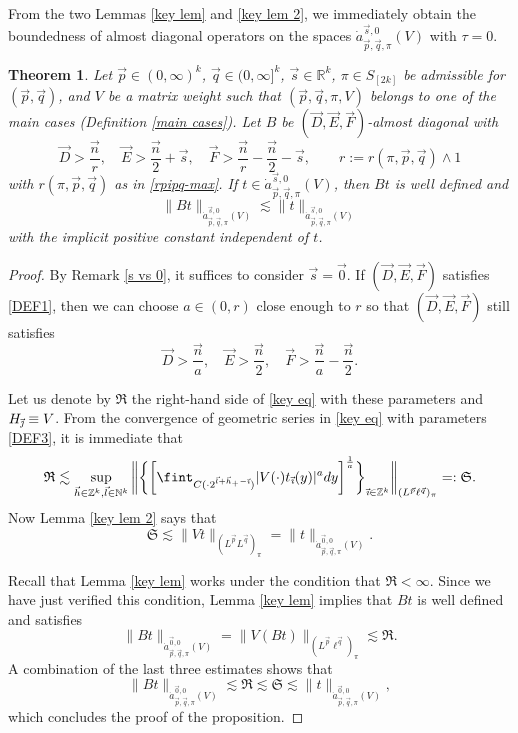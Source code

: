 \documentclass[11pt, reqno]{amsart}
\newtheorem{theorem}{Theorem}[section]
\theoremstyle{definition}
\theoremstyle{remark}
\numberwithin{equation}{section}
\newcommand{\vD}{\vec D}
\newcommand{\vE}{\vec E}
\newcommand{\vF}{\vec F}
\newcommand{\N}{\mathbb N}
\newcommand{\R}{\mathbb R}
\newcommand{\Z}{\mathbb Z}
\newcommand{\vnull}{\vec 0}
\newcommand{\vh}{\vec h}
\newcommand{\vi}{\vec{\textit{\i}}}
\newcommand{\vj}{\vec{\textit{\j}}}
\newcommand{\vn}{\vec n}
\newcommand{\vl}{\vec l}
\newcommand{\vp}{\vec p}
\newcommand{\vq}{\vec q}
\newcommand{\vs}{\vec s}
\newcommand{\ann}{\dot a^{\vnull,0}_{\vp,\vq,\pi}}
\newcommand{\asn}{\dot a^{\vs,0}_{\vp,\vq,\pi}}
\newcommand{\abs}[1]{|#1|}
\newcommand{\Norm}[2]{\|#1\|_{#2}}
\newcommand{\bbNorm}[2]{\bigg\|#1\bigg\|_{#2}}
\begin{document}
From the two Lemmas \ref{key lem} and \ref{key lem 2}, we immediately obtain the boundedness of almost diagonal operators on the spaces $\asn(V)$ with $\tau=0$.

\begin{theorem}\label{AD s0}
Let $\vp\in(0,\infty)^k$, $\vq\in(0,\infty]^k$, $\vs\in\R^k$, $\pi\in S_{[2k]}$ be admissible for $(\vp,\vq)$, and $V$ be a matrix weight such that $(\vp,\vq,\pi,V)$ belongs to one of the main cases (Definition \ref{main cases}).
Let $B$ be $(\vD,\vE,\vF)$-almost diagonal with
\begin{equation}\label{DEF1}
\vD>\frac{\vn}{r},\quad
\vE>\frac{\vn}{2}+\vs,\quad
\vF>\frac{\vn}{r}-\frac{\vn}{2}-\vs,\qquad r:=r(\pi,\vp,\vq)\wedge 1
\end{equation}
with $r(\pi,\vp,\vq)$ as in \eqref{rpipq-max}.
If $t\in\asn(V)$, then $Bt$ is well defined and
\begin{equation*}
\Norm{Bt}{\asn(V)}
\lesssim\Norm{t}{\asn(V)}
\end{equation*}
with the implicit positive constant independent of $t$.
\end{theorem}

\begin{proof}
By Remark \ref{s vs 0}, it suffices to consider $\vs=\vnull$. If $(\vD,\vE,\vF)$ satisfies \eqref{DEF1}, then we can choose $a\in(0,r)$ close enough to $r$ so that $(\vD,\vE,\vF)$ still satisfies
\begin{equation}\label{DEF3}
\vD>\frac{\vn}{a},\quad
\vE>\frac{\vn}{2},\quad
\vF>\frac{\vn}{a}-\frac{\vn}{2}.
\end{equation}

Let us denote by $\mathfrak{R}$ the right-hand side of \eqref{key eq} with these parameters and $H_{\vj}\equiv V$. From the convergence of geometric series in \eqref{key eq} with parameters \eqref{DEF3}, it is immediate that
\begin{equation*}
\mathfrak{R}\lesssim\sup_{\vh\in\Z^k,\vl\in\N^k}
\bbNorm{\bigg\{\bigg[\fint_{C(\cdot 2^{\vl+\vh_+-\vi})}\abs{V(\cdot)t_{\vi}(y)}^a dy\bigg]^{\frac1a}\bigg\}_{\vi\in\Z^k}}{(L^{\vp}\ell^{\vq})_\pi}
=:\mathfrak{S}.
\end{equation*}
Now Lemma \ref{key lem 2} says that
\begin{equation*}
\mathfrak{S} \lesssim \Norm{Vt}{(L^{\vp}L^{\vq})_\pi}=\Norm{t}{\ann(V)}.
\end{equation*}

Recall that Lemma \ref{key lem} works under the condition that $\mathfrak{R}<\infty$. Since we have just verified this condition, Lemma \ref{key lem} implies that $Bt$ is well defined and satisfies
\begin{equation*}
\Norm{Bt}{\ann(V)}
=\Norm{V(Bt)}{(L^{\vp}\ell^{\vq})_\pi}
\lesssim\mathfrak{R}.
\end{equation*}
A combination of the last three estimates shows that
\begin{equation*}
\Norm{Bt}{\ann(V)}
\lesssim\mathfrak{R}
  \lesssim\mathfrak{S}
  \lesssim\Norm{t}{\ann(V)},
\end{equation*}
which concludes the proof of the proposition.
\end{proof}
\end{document}

